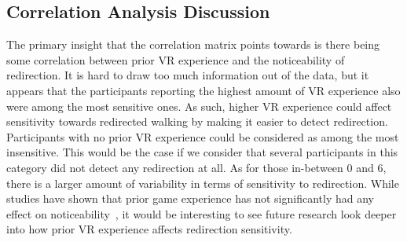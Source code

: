 \subsection{Correlation Analysis Discussion}\label{sec:ex1demogDiscussion}
The primary insight that the correlation matrix points towards is there being some correlation between prior VR experience and the noticeability of redirection. It is hard to draw too much information out of the data, but it appears that the participants reporting the highest amount of VR experience also were among the most sensitive ones. As such, higher VR experience could affect sensitivity towards redirected walking by making it easier to detect redirection. Participants with no prior VR experience could be considered as among the most insensitive. This would be the case if we consider that several participants in this category did not detect any redirection at all. As for those in-between 0 and 6, there is a larger amount of variability in terms of sensitivity to redirection. While studies have shown that prior game experience has not significantly had any effect on noticeability~\cite{nguyen2018individual}, it would be interesting to see future research look deeper into how prior VR experience affects redirection sensitivity.
